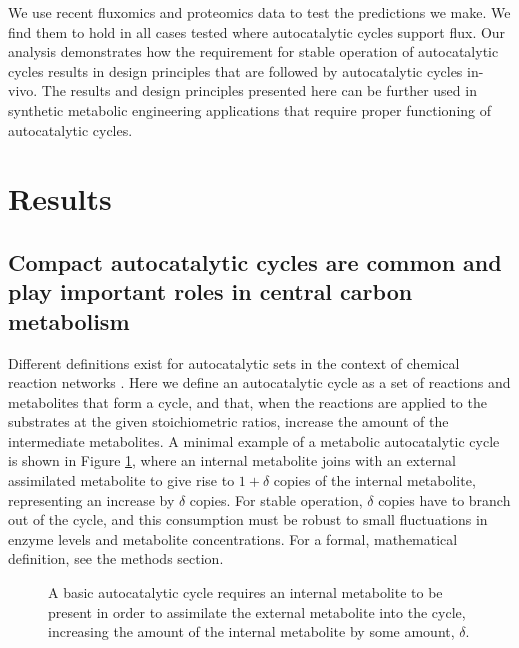     We use recent fluxomics and proteomics data to test the predictions we make.
    We find them to hold in all cases tested where autocatalytic cycles support flux.
    Our analysis demonstrates how the requirement for stable operation of autocatalytic cycles results in design principles that are followed by autocatalytic cycles in-vivo.
    The results and design principles presented here can be further used in synthetic metabolic engineering applications that require proper functioning of autocatalytic cycles.

\section{Results}
\subsection{Compact autocatalytic cycles are common and play important roles in central carbon metabolism}
Different definitions exist for autocatalytic sets in the context of chemical reaction networks \cite{Hordijk2004-xe, Eigen2012-ti, Kun2008-xg}.
Here we define an autocatalytic cycle as a set of reactions and metabolites that form a cycle, and that, when the reactions are applied to the substrates at the given stoichiometric ratios, increase the amount of the intermediate metabolites.
A minimal example of a metabolic autocatalytic cycle is shown in Figure \ref{fig:autocataldef}, where an internal metabolite joins with an external assimilated metabolite to give rise to $1+\delta$ copies of the internal metabolite, representing an increase by $\delta$ copies.
For stable operation, $\delta$ copies have to branch out of the cycle, and this consumption must be robust to small fluctuations in enzyme levels and metabolite concentrations.
For a formal, mathematical definition, see the methods section.

\begin{figure}[!htb]
    \centering{
        }
\caption{
    \label{fig:autocataldef}
  A basic autocatalytic cycle requires an internal metabolite to be present in order to assimilate the external metabolite into the cycle, increasing the amount of the internal metabolite by some amount, $\delta$.}
\end{figure}

